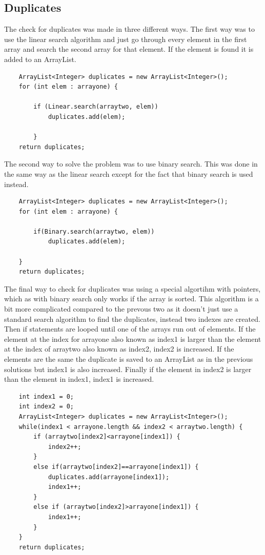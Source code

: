 \documentclass[a4paper,11pt]{article}
\begin{document}
\subsection*{Duplicates}
The check for duplicates was made in three different ways. The first way was to use the linear search algorithm and just go through every element in the first array
and search the second array for that element. If the element is found it is added to an ArrayList.
\begin{verbatim}
    ArrayList<Integer> duplicates = new ArrayList<Integer>();
    for (int elem : arrayone) {

        if (Linear.search(arraytwo, elem))
            duplicates.add(elem);

        }
    return duplicates;    
\end{verbatim}
The second way to solve the problem was to use binary search. This was done in the same way as the linear search except for the fact that binary search
is used instead. 
\begin{verbatim}
    ArrayList<Integer> duplicates = new ArrayList<Integer>();
    for (int elem : arrayone) {

        if(Binary.search(arraytwo, elem))
            duplicates.add(elem);

    }
    return duplicates;
\end{verbatim}
The final way to check for duplicates was using a special algortihm with pointers, which as with binary search only works if the array is sorted. This algorithm is 
a bit more complicated compared to the prevous two as it doesn't just use a standard search algorithm to find the duplicates, instead two indexes are created. Then if statements are looped until 
one of the arrays run out of elements. If the 
element at the index for arrayone also known as index1 is larger than the element at the index of arraytwo also known as index2, index2 is increased. If the elements are the same 
the duplicate is saved to an ArrayList as in the previous solutions but index1 is also increased. Finally if the element in index2 is larger than the element in index1, index1 is increased. 
\begin{verbatim}
    int index1 = 0;
    int index2 = 0;
    ArrayList<Integer> duplicates = new ArrayList<Integer>();
    while(index1 < arrayone.length && index2 < arraytwo.length) {
        if (arraytwo[index2]<arrayone[index1]) {
            index2++;
        }
        else if(arraytwo[index2]==arrayone[index1]) {
            duplicates.add(arrayone[index1]);
            index1++;            
        }
        else if (arraytwo[index2]>arrayone[index1]) {
            index1++;
        }
    }
    return duplicates;    
\end{verbatim}
\end{document}
